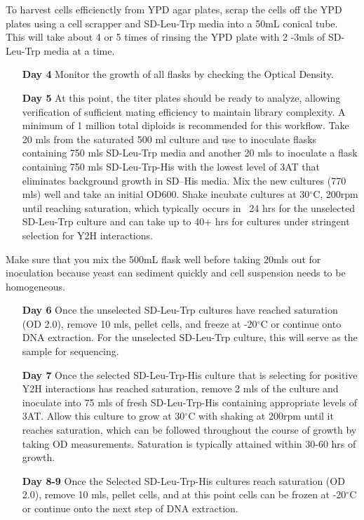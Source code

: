 \documentclass[11pt,fleqn]{book} %
\begin{document}
\begin{remark}
    To harvest cells efficienctly from YPD agar plates, scrap the cells off the YPD plates using a cell scrapper and SD-Leu-Trp media into a 50mL conical tube.  This will take about 4 or 5 times of rinsing the YPD plate with 2 -3mls of SD-Leu-Trp media at a time. 
\end{remark}

\begin{enumerate}[leftmargin=0.8in]
    \item[\textbf{Day 4}] Monitor the growth of all flasks by checking the Optical Density.
    \item[\textbf{Day 5}] At this point, the titer plates should be ready to analyze, allowing verification of sufficient mating efficiency to maintain library complexity.  A minimum of 1 million total diploids is recommended for this workflow. Take 20 mls from the saturated 500 ml culture and use to inoculate flasks containing 750 mls SD-Leu-Trp media and another 20 mls to inoculate a flask containing 750 mls SD-Leu-Trp-His with the lowest level of 3AT that eliminates background growth in SD–His media. Mix the new cultures (770 mls) well and take an initial OD600.  Shake incubate cultures at 30$^\circ$C, 200rpm until reaching saturation, which typically occurs in ~24 hrs for the unselected SD-Leu-Trp culture and can take up to 40+ hrs for cultures under stringent selection for Y2H interactions.   
\end{enumerate}


\begin{warning}
    Make sure that you mix the 500mL flask well before taking 20mls out for inoculation because yeast can sediment quickly and cell suspension needs to be homogeneous. 
\end{warning}


\begin{enumerate}[leftmargin=0.8in]
    \item[\textbf{Day 6}] Once the unselected SD-Leu-Trp cultures have reached saturation (OD 2.0), remove 10 mls, pellet cells, and freeze at -20$^\circ$C or continue onto DNA extraction.  For the unselected SD-Leu-Trp culture, this will serve as the sample for sequencing.  
    \item[\textbf{Day 7}] Once the selected SD-Leu-Trp-His culture that is selecting for positive Y2H interactions has reached saturation, remove 2 mls of the culture and inoculate into 75 mls of fresh SD-Leu-Trp-His containing appropriate levels of 3AT. Allow this culture to grow at 30$^\circ$C with shaking at 200rpm until it reaches saturation, which can be followed throughout the course of growth by taking OD measurements. Saturation is typically attained within 30-60 hrs of growth.  
    \item[\textbf{Day 8-9}] Once the Selected SD-Leu-Trp-His cultures reach saturation (OD 2.0), remove 10 mls, pellet cells, and at this point cells can be frozen at -20$^\circ$C or continue onto the next step of DNA extraction.    
\end{enumerate}
\end{document}
